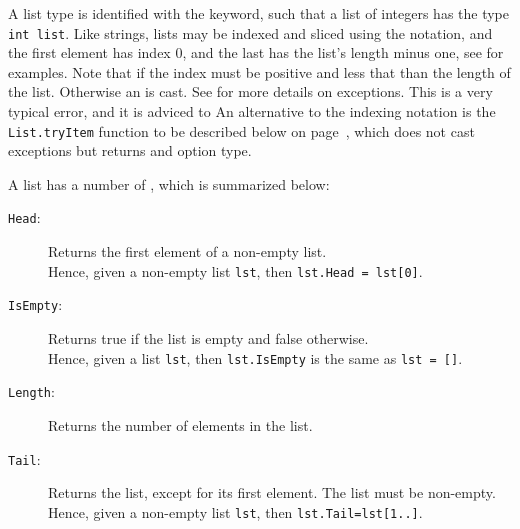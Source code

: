 \documentclass[fsharpNotes.tex]{subfiles}
\begin{document}
A list type is identified with the  keyword, such that a list of integers has the type \lstinline!int list!. Like strings, lists may be indexed and sliced using the \idx[{[]}@\lstinline{[]}]{\lexeme{[]}} notation, and the first element has index 0, and the last has the list's length minus one, see  for examples.
%
%
Note that if the index must be positive and less that than the length of the list. Otherwise an  is cast. See  for more details on exceptions. This is a very typical error, and it is adviced to  An alternative to the \lexeme{[]} indexing notation is the \lstinline{List.tryItem} function to be described below on page~\pageref{item:listTryItem}, which does not cast exceptions but returns and option type.

\newpage
A list has a number of , which is summarized below:
\begin{description}
\item[\texttt{Head}:] Returns the first element of a non-empty list.
  ~\\
  Hence, given a non-empty list \lstinline{lst}, then \lstinline{lst.Head = lst[0]}.
\item[\texttt{IsEmpty}:] Returns true if the list is empty and false otherwise.
  ~\\
  Hence, given a list \lstinline{lst}, then \lstinline{lst.IsEmpty} is the same as \lstinline{lst = []}.
\item[\texttt{Length}:] Returns the number of elements in the list.
  ~\\
\item[\texttt{Tail}:] Returns the list, except for its first element. The list must be non-empty.
  ~\\
  Hence, given a non-empty list \lstinline{lst}, then \lstinline{lst.Tail=lst[1..]}.
\end{description}
\end{document}
